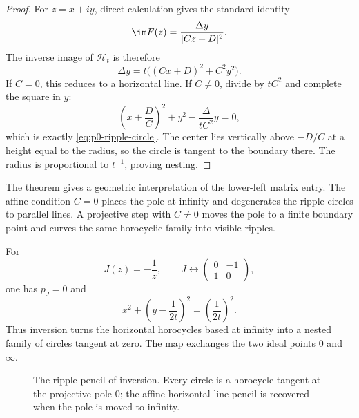 \begin{proof}
For $z=x+iy$, direct calculation gives the standard identity
\begin{equation}\label{eq:p0-imaginary-mobius}
  \im F(z)=\frac{\Delta y}{|Cz+D|^2}.
\end{equation}
The inverse image of $\mathcal H_t$ is therefore
\[
  \Delta y=t\bigl((Cx+D)^2+C^2y^2\bigr).
\]
If $C=0$, this reduces to a horizontal line.  If $C\ne0$, divide by
$tC^2$ and complete the square in $y$:
\[
  \left(x+\frac DC\right)^2+y^2
  -\frac{\Delta}{tC^2}y=0,
\]
which is exactly \eqref{eq:p0-ripple-circle}.  The center lies vertically
above $-D/C$ at a height equal to the radius, so the circle is tangent to the
boundary there.  The radius is proportional to $t^{-1}$, proving nesting.
\end{proof}

The theorem gives a geometric interpretation of the lower-left matrix entry.
The affine condition $C=0$ places the pole at infinity and degenerates the
ripple circles to parallel lines.  A projective step with $C\ne0$ moves the pole
to a finite boundary point and curves the same horocyclic family into visible
ripples.

\begin{example}
\label{ex:p0-inversion-ripples}
For
\[
  J(z)=-\frac1z,
  \qquad
  J\leftrightarrow
  \begin{pmatrix}0&-1\\1&0\end{pmatrix},
\]
one has $p_J=0$ and
\begin{equation}\label{eq:p0-inversion-circles}
  x^2+\left(y-\frac1{2t}\right)^2
  =\left(\frac1{2t}\right)^2.
\end{equation}
Thus inversion turns the horizontal horocycles based at infinity into a nested
family of circles tangent at zero.  The map exchanges the two ideal points
$0$ and $\infty$.
\end{example}

\begin{figure}[t]
\centering
{}
\caption{The ripple pencil of inversion.  Every circle is a horocycle tangent
at the projective pole $0$; the affine horizontal-line pencil is recovered
when the pole is moved to infinity.}
\label{fig:p0-inversion-ripple-pencil}
\end{figure}

